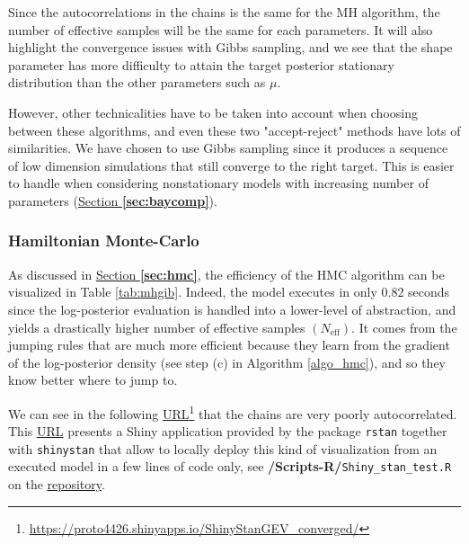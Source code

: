 Since the autocorrelations in the chains is the same for the MH algorithm, the number of effective samples will be the same for each parameters. It will also highlight the convergence issues with Gibbs sampling, and we see that the shape parameter has more difficulty to attain the target posterior stationary distribution than the other parameters such as $\mu$.

However, other technicalities have to be taken into account when choosing between these algorithms,  and even these two "accept-reject" methods have lots of similarities. We have chosen to use Gibbs sampling since it produces a sequence of low dimension simulations that still converge to the right target. This is easier to handle when considering nonstationary models with increasing number of parameters (\hyperref[sec:baycomp]{Section \textbf{\ref{sec:baycomp}}}).

 \subsubsection*{Hamiltonian Monte-Carlo}

As discussed in \hyperref[sec:hmc]{Section \textbf{\ref{sec:hmc}}}, the efficiency of the HMC algorithm can be visualized in Table \ref{tab:mhgib}. Indeed, the model executes in only $0.82$ seconds since the log-posterior evaluation is handled into a lower-level of abstraction, and yields a drastically higher number of effective samples $(N_{\text{eff}})$. It comes from the jumping rules that are much more efficient because they learn from the gradient of the log-posterior density (see step (c) in Algorithm \ref{algo_hmc}), and so they know better where to jump to.

We can see in the following \href{https://proto4426.shinyapps.io/ShinyStanGEV_converged/}{URL}\footnote{\url{https://proto4426.shinyapps.io/ShinyStanGEV_converged/}} that the chains are very poorly autocorrelated. This \href{https://proto4426.shinyapps.io/ShinyStanGEV_converged/}{URL} presents a Shiny application provided by the package \texttt{rstan} together with \texttt{shinystan} that allow to locally deploy this kind of visualization from an executed model in a few lines of code only, see \textbf{/Scripts-R/}\texttt{Shiny\_stan\_test.R} on the \href{https://github.com/proto4426/PissoortThesis/}{repository}. 

